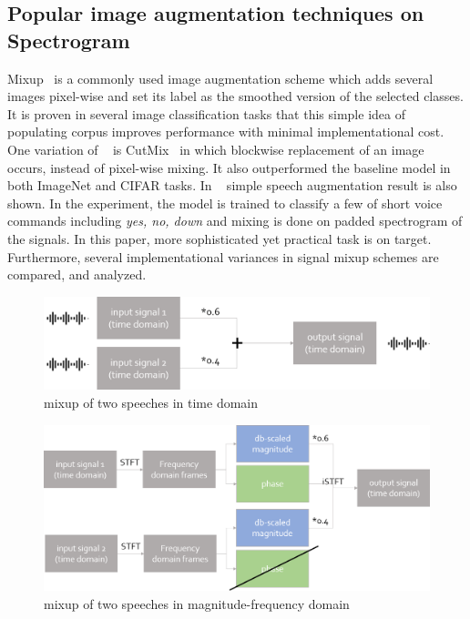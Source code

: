 \documentclass[10pt,twocolumn,letterpaper]{article}
\begin{document}
\subsection{Popular image augmentation techniques on Spectrogram}
\label{sec:popular}

Mixup~\cite{zhang2017mixup} is a commonly used image augmentation scheme which adds several images 
pixel-wise and set its label as the smoothed version of the selected classes. It is proven in several image 
classification tasks that this simple idea of populating corpus improves performance with minimal 
implementational cost. 
One variation of ~\cite{zhang2017mixup} is CutMix~\cite{yun2019cutmix} in which blockwise replacement of an image
occurs, instead of pixel-wise mixing. It also outperformed the baseline model in both ImageNet and CIFAR tasks.
In ~\cite{zhang2017mixup} simple speech augmentation result is also shown. In the experiment, the model is trained 
to classify a few of short voice commands including \textit{yes, no, down} and mixing is done on 
padded spectrogram of the signals.
In this paper, more sophisticated yet practical task is on target. Furthermore, several implementational variances 
in signal mixup schemes are compared, and analyzed.

\begin{figure}[h]
   \centering
   \includegraphics[width=\linewidth]{time_add}
   \caption{mixup of two speeches in time domain}
   \label{fig:time_add}
\end{figure} 

\begin{figure}[h]
   \centering
   \includegraphics[width=\linewidth]{freq_add}
   \caption{mixup of two speeches in magnitude-frequency domain}
   \label{fig:freq_add}
\end{figure} 
\end{document}
